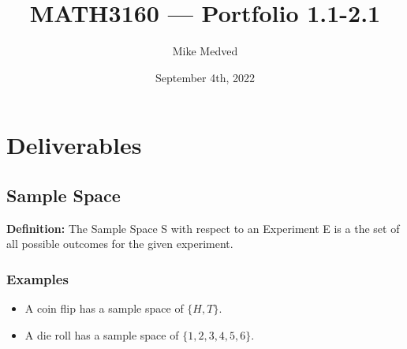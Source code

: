 \documentclass{article}
\title{MATH3160 — Portfolio 1.1-2.1}
\author{Mike Medved}
\date{September 4th, 2022}
\begin{document}
\maketitle

\section{Deliverables}

\subsection{Sample Space}

\textbf{Definition:} The Sample Space S with respect to an Experiment E is a the set of all possible outcomes for the given experiment.

\subsubsection{Examples}

\begin{itemize}
    \item A coin flip has a sample space of $\{H, T\}$.
    \item A die roll has a sample space of $\{1, 2, 3, 4, 5, 6\}$.
\end{itemize}

\break
\end{document}
